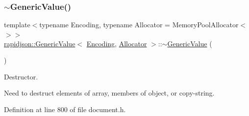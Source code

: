 \subsubsection{\texorpdfstring{$\sim$GenericValue()}{~GenericValue()}}
{\footnotesize\ttfamily template$<$typename Encoding, typename Allocator = Memory\+Pool\+Allocator$<$$>$$>$ \\
\mbox{\hyperlink{classrapidjson_1_1_generic_value}{rapidjson\+::\+Generic\+Value}}$<$ \mbox{\hyperlink{classrapidjson_1_1_encoding}{Encoding}}, \mbox{\hyperlink{classrapidjson_1_1_allocator}{Allocator}} $>$\+::$\sim$\mbox{\hyperlink{classrapidjson_1_1_generic_value}{Generic\+Value}} (\begin{DoxyParamCaption}{ }\end{DoxyParamCaption})}



Destructor. 

Need to destruct elements of array, members of object, or copy-\/string. 

Definition at line 800 of file document.\+h.


